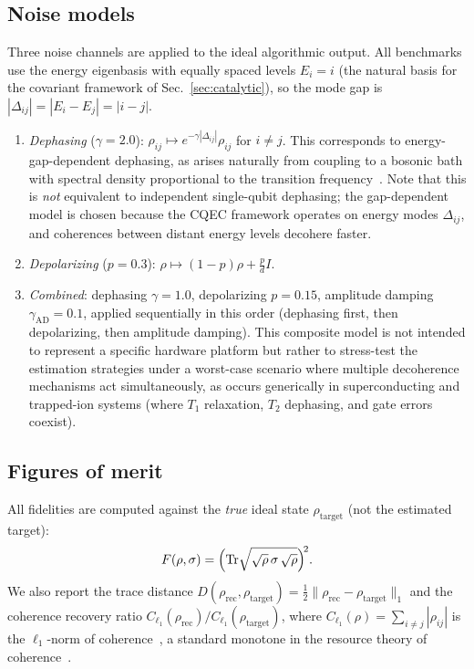 \documentclass[prx,twocolumn,superscriptaddress,longbibliography,floatfix]{revtex4-2}
\newcommand{\tr}{\mathrm{Tr}}
\newcommand{\rhot}{\rho_\mathrm{target}}
\newcommand{\rhor}{\rho_\mathrm{rec}}
\begin{document}
\subsection{Noise models}
\label{sec:noise}

Three noise channels are applied to the ideal algorithmic output.
All benchmarks use the energy eigenbasis with equally spaced levels $E_i = i$ (the natural basis for the covariant framework of Sec.~\ref{sec:catalytic}), so the mode gap is $|\Delta_{ij}| = |E_i - E_j| = |i - j|$.
\begin{enumerate}
\item \emph{Dephasing} ($\gamma = 2.0$): $\rho_{ij} \mapsto e^{-\gamma|\Delta_{ij}|}\rho_{ij}$ for $i \neq j$.
This corresponds to energy-gap-dependent dephasing, as arises naturally from coupling to a bosonic bath with spectral density proportional to the transition frequency~\cite{NielsenChuang2010}.
Note that this is \emph{not} equivalent to independent single-qubit dephasing; the gap-dependent model is chosen because the CQEC framework operates on energy modes $\Delta_{ij}$, and coherences between distant energy levels decohere faster.
\item \emph{Depolarizing} ($p = 0.3$): $\rho \mapsto (1-p)\rho + \frac{p}{d}I$.
\item \emph{Combined}: dephasing $\gamma = 1.0$, depolarizing $p = 0.15$, amplitude damping $\gamma_\mathrm{AD} = 0.1$, applied sequentially in this order (dephasing first, then depolarizing, then amplitude damping).
This composite model is not intended to represent a specific hardware platform but rather to stress-test the estimation strategies under a worst-case scenario where multiple decoherence mechanisms act simultaneously, as occurs generically in superconducting and trapped-ion systems (where $T_1$ relaxation, $T_2$ dephasing, and gate errors coexist).
\end{enumerate}

\subsection{Figures of merit}
\label{sec:figures_merit}

All fidelities are computed against the \emph{true} ideal state $\rhot$ (not the estimated target):
\begin{equation}
F(\rho,\sigma) = \Bigl(\tr\sqrt{\sqrt{\rho}\,\sigma\,\sqrt{\rho}}\Bigr)^{\!2}.
\label{eq:fidelity}
\end{equation}
We also report the trace distance $D(\rhor, \rhot) = \frac{1}{2}\|\rhor - \rhot\|_1$ and the coherence recovery ratio $C_{\ell_1}(\rhor)/C_{\ell_1}(\rhot)$, where $C_{\ell_1}(\rho) = \sum_{i \neq j} |\rho_{ij}|$ is the $\ell_1$-norm of coherence~\cite{Baumgratz2014}, a standard monotone in the resource theory of coherence~\cite{Streltsov2017}.
\end{document}
